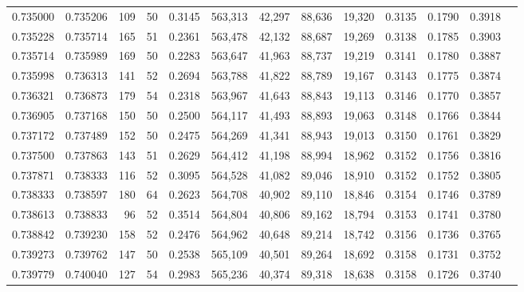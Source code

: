 \begin{tabular}{rrrrrrrrrrrrr}
0.735000 & 0.735206 &    109 &    50 &                                     0.3145 & 563,313 &  42,297 &  88,636 &  19,320 & 0.3135 & 0.1790 & 0.3918 \\
0.735228 & 0.735714 &    165 &    51 &                                     0.2361 & 563,478 &  42,132 &  88,687 &  19,269 & 0.3138 & 0.1785 & 0.3903 \\
0.735714 & 0.735989 &    169 &    50 &                                     0.2283 & 563,647 &  41,963 &  88,737 &  19,219 & 0.3141 & 0.1780 & 0.3887 \\
0.735998 & 0.736313 &    141 &    52 &                                     0.2694 & 563,788 &  41,822 &  88,789 &  19,167 & 0.3143 & 0.1775 & 0.3874 \\
0.736321 & 0.736873 &    179 &    54 &                                     0.2318 & 563,967 &  41,643 &  88,843 &  19,113 & 0.3146 & 0.1770 & 0.3857 \\
0.736905 & 0.737168 &    150 &    50 &                                     0.2500 & 564,117 &  41,493 &  88,893 &  19,063 & 0.3148 & 0.1766 & 0.3844 \\
0.737172 & 0.737489 &    152 &    50 &                                     0.2475 & 564,269 &  41,341 &  88,943 &  19,013 & 0.3150 & 0.1761 & 0.3829 \\
0.737500 & 0.737863 &    143 &    51 &                                     0.2629 & 564,412 &  41,198 &  88,994 &  18,962 & 0.3152 & 0.1756 & 0.3816 \\
0.737871 & 0.738333 &    116 &    52 &                                     0.3095 & 564,528 &  41,082 &  89,046 &  18,910 & 0.3152 & 0.1752 & 0.3805 \\
0.738333 & 0.738597 &    180 &    64 &                                     0.2623 & 564,708 &  40,902 &  89,110 &  18,846 & 0.3154 & 0.1746 & 0.3789 \\
0.738613 & 0.738833 &     96 &    52 &                                     0.3514 & 564,804 &  40,806 &  89,162 &  18,794 & 0.3153 & 0.1741 & 0.3780 \\
0.738842 & 0.739230 &    158 &    52 &                                     0.2476 & 564,962 &  40,648 &  89,214 &  18,742 & 0.3156 & 0.1736 & 0.3765 \\
0.739273 & 0.739762 &    147 &    50 &                                     0.2538 & 565,109 &  40,501 &  89,264 &  18,692 & 0.3158 & 0.1731 & 0.3752 \\
0.739779 & 0.740040 &    127 &    54 &                                     0.2983 & 565,236 &  40,374 &  89,318 &  18,638 & 0.3158 & 0.1726 & 0.3740 \\

\end{tabular}
